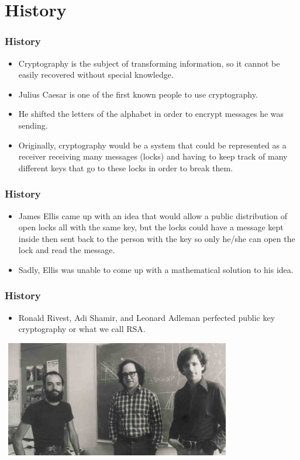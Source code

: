 \documentclass{beamer}
\begin{document}
\section{History}
\begin{frame}
\frametitle{History}
\begin{itemize}
\item Cryptography is the subject of transforming information, so it cannot be easily recovered without special knowledge. 
\item Julius Caesar is one of the first known people to use cryptography.
\item He shifted the letters of the alphabet in order to encrypt messages he was sending. 
\item Originally, cryptography would be a system that could be represented as a receiver receiving many messages (locks) and having to keep track of many different keys that go to these locks in order to break them. 
\end{itemize}
\end{frame}
\begin{frame}
\frametitle{History}
\begin{itemize}
\item James Ellis came up with an idea that would allow a public distribution of open locks all with the same key, but the locks could have a message kept inside then sent back to the person with the key so only he/she can open the lock and read the message.
\item Sadly, Ellis was unable to come up with a mathematical solution to his idea.
\end{itemize}
\end{frame}
\begin{frame}
\frametitle{History}
\begin{itemize}
\item Ronald Rivest, Adi Shamir, and Leonard Adleman perfected public key cryptography or what we call RSA.
\end{itemize}
\begin{center}
\includegraphics[width=4in, height=2in]{RSA.jpg}\\
\end{center}
\end{frame}
\end{document}
